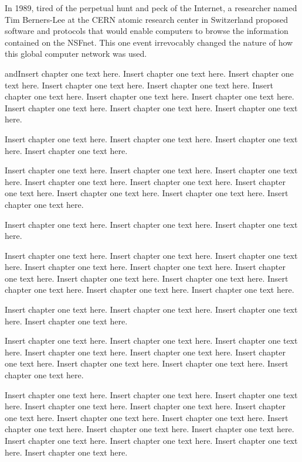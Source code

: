 In 1989, tired of the perpetual hunt and peck of the Internet, a researcher named Tim Berners-Lee at the CERN atomic research center in Switzerland proposed software and protocols that would enable computers to browse the information contained on the NSFnet. This one event irrevocably changed the nature of how this global computer network was used.

andInsert chapter one text here. Insert chapter one text here. Insert chapter one text here. Insert chapter one text here. Insert chapter one text here. Insert chapter one text here. Insert chapter one text here. Insert chapter one text here. Insert chapter one text here. Insert chapter one text here. Insert chapter one text here.

Insert chapter one text here. Insert chapter one text here. Insert chapter one text here. Insert chapter one text here. 

Insert chapter one text here. Insert chapter one text here. Insert chapter one text here. Insert chapter one text here. Insert chapter one text here. Insert chapter one text here. Insert chapter one text here. Insert chapter one text here. Insert chapter one text here.

Insert chapter one text here. Insert chapter one text here. Insert chapter one text here.

Insert chapter one text here. Insert chapter one text here. Insert chapter one text here. Insert chapter one text here. Insert chapter one text here. Insert chapter one text here. Insert chapter one text here. Insert chapter one text here. Insert chapter one text here. Insert chapter one text here. Insert chapter one text here.

Insert chapter one text here. Insert chapter one text here. Insert chapter one text here. Insert chapter one text here. 

Insert chapter one text here. Insert chapter one text here. Insert chapter one text here. Insert chapter one text here. Insert chapter one text here. Insert chapter one text here. Insert chapter one text here. Insert chapter one text here. Insert chapter one text here.

Insert chapter one text here. Insert chapter one text here. Insert chapter one text here. Insert chapter one text here. Insert chapter one text here. Insert chapter one text here. Insert chapter one text here. Insert chapter one text here. Insert chapter one text here. Insert chapter one text here. Insert chapter one text here. Insert chapter one text here. Insert chapter one text here. Insert chapter one text here. Insert chapter one text here. 

